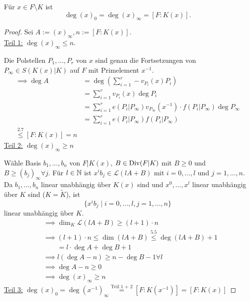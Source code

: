 \begin{satz}
    Für $x \in F \setminus K$ ist 
    $$ \deg (x)_0 = \deg (x)_\infty = [F:K(x)].$$
\end{satz}
\begin{proof}
    Sei $ A := (x)_\infty, n := [F:K(x)]$.\\
    \underline{Teil 1:} $\deg (x)_\infty \leq n$.

    Die Polstellen $P_1,\ldots, P_r$ von  $x$ sind genau die Fortsetzungen von $P_\infty \in S(K(x)|K)$
    auf $F$ mit Primelement $x^{-1}$.
    \begin{align*}
        \implies \deg A &= \deg \left(\sum\limits_{i=1}^r -v_{P_i}(x)P_i\right)\\
        &= \sum\limits_{i=1}^r v_{P_i}(x) \deg P_i\\
        &= \sum\limits_{i=1}^r e(P_i | P_\infty)v_{P_\infty}(x^{-1})\cdot f(P_i|P_\infty)\deg P_\infty\\
        &= \sum\limits_{i=1}^r e(P_i | P_\infty)f(P_i|P_\infty)\\
        \stackrel{2.7}{\leq} [F: K(x)] = n
    \end{align*}
    \underline{Teil 2:} $\deg (x)_\infty \geq n$

    Wähle Basis $b_1,\ldots,b_n$ von $F|K(x)$, $B \in \operatorname{Div}(F|K)$ mit $B \geq 0$ und $B \geq (b_j)_\infty \forall j$.
    Für $l \in \mathbb{N}$ ist $x^i b_j \in \mathcal{L}(lA+B)$ mit $i=0,\ldots,l$ und $j=1,\ldots,n$.
    Da $b_1,\ldots,b_n$ linear unabhängig über $K(x)$ sind und $x^0, \ldots, x^l$ linear unabhängig über $K$ sind ($K=\widetilde{K}$),
    ist $$ \{x^i b_j \mid i=0, \ldots,l, j=1, \ldots,n\}$$ linear unabhängig über $K$.
    \begin{align*}
        &\implies \dim_K \mathcal{L}(lA + B) \geq (l + 1) \cdot n\\
        &\implies (l + 1) \cdot n \leq \dim (lA + B) \stackrel{5.5}{\leq} \deg (lA + B) + 1\\
        &\qquad = l \cdot \deg A + \deg B + 1\\
        & \implies l(\deg A - n) \geq n - \deg B - 1 \forall l\\
        &\implies \deg A - n \geq 0 \\
        &\implies \deg (x)_\infty \geq n
    \end{align*}
    \underline{Teil 3:} $\deg (x)_0 = \deg (x^{-1})_\infty \stackrel{\text{Teil 1 + 2}}{=} [F: K(x^{-1})] = [F:K(x)]$
\end{proof}

